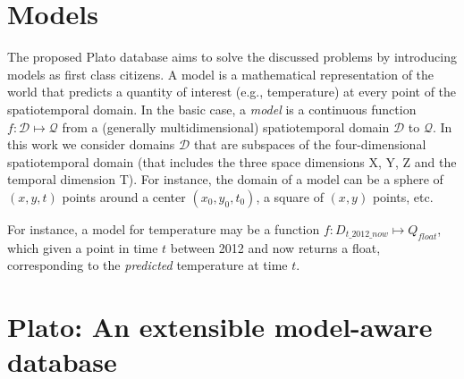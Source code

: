 
\section{Models}
\label{sec:models}


The proposed Plato database aims to solve the discussed problems by introducing models as first class citizens. A model is a mathematical representation of the world that predicts a quantity of interest (e.g., temperature) at every point of the spatiotemporal domain.
In the basic case, a {\em model} is a continuous function $f:\mathcal{D}\mapsto \mathcal{Q}$ from a (generally multidimensional) spatiotemporal domain $\mathcal{D}$ to $\mathcal{Q}$. In this work we consider domains $\mathcal{D}$ that are subspaces of the four-dimensional spatiotemporal domain (that includes the three space dimensions X, Y, Z and the temporal dimension T). For instance, the domain of a model can be a sphere of $(x, y, t)$ points around a center $(x_0, y_0, t_0)$, a square of $(x, y)$ points, etc.

\vspace*{0.5cm}
\begin{example}
For instance, a model for temperature may be a function $f:D_{t\_2012\_now}\mapsto Q_{float}$, which given a point in time $t$ between 2012 and now returns a float, corresponding to the \emph{predicted} temperature at time $t$.
\end{example}
\vspace*{0.5cm}

\section{Plato: An extensible model-aware database}
\label{sec:architecture}

